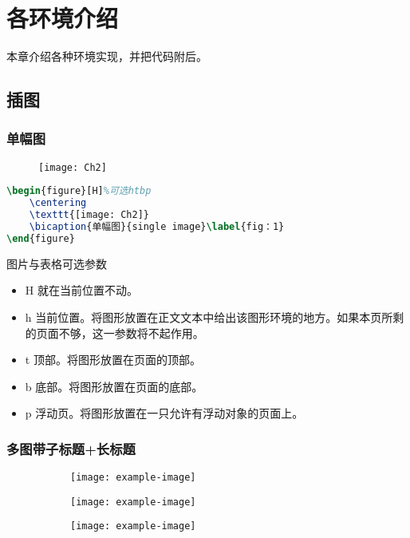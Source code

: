 \chapter{各环境介绍}
本章介绍各种环境实现，并把代码附后。
\section{插图}
\subsection{单幅图}
\begin{figure}[H]
\centering
\texttt{[image: Ch2]}
\label{fig：1}
\end{figure}
\begin{lstlisting}[language=TeX]
\begin{figure}[H]%可选htbp
	\centering
	\texttt{[image: Ch2]}
	\bicaption{单幅图}{single image}\label{fig：1}
\end{figure}
\end{lstlisting}

图片与表格可选参数

\begin{itemize}
	\item H 就在当前位置不动。
	\item h 当前位置。将图形放置在正文文本中给出该图形环境的地方。如果本页所剩的页面不够，这一参数将不起作用。
	\item t 顶部。将图形放置在页面的顶部。
	\item b 底部。将图形放置在页面的底部。
	\item p 浮动页。将图形放置在一只允许有浮动对象的页面上。
\end{itemize}

\subsection{多图带子标题+长标题}
\begin{figure}[htp]
	\begin{subfigure}[b]{0.3\textwidth}
		\centering
		\texttt{[image: example-image]}
		\label{fig:2-1}
	\end{subfigure}
	\hfill
	\begin{subfigure}[b]{0.3\textwidth}
		\centering
		\texttt{[image: example-image]}
		\label{fig:2-2}
	\end{subfigure}
	\hfill
	\begin{subfigure}[b]{0.3\textwidth}
		\centering
		\texttt{[image: example-image]}
		\label{fig:2-3}
	\end{subfigure}
	\label{fig:2}
\end{figure}
\vspace{.5cm}

